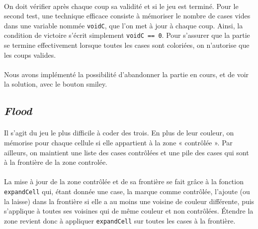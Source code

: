 \documentclass[a4paper]{article}
\newcommand\ttt\texttt
\begin{document}
	\paragraph{}
	On doit vérifier après chaque coup sa validité et si le jeu est terminé.
	Pour le second test, une technique efficace consiste à mémoriser le nombre
	de cases vides dans une variable nommée \ttt{voidC}, que l'on met à jour
	à chaque coup. Ainsi, la condition de victoire s’écrit simplement
	\ttt{voidC == 0}. Pour s’assurer que la partie se termine effectivement
	lorsque toutes les cases sont coloriées, on n’autorise que les coups
	valides.

	\paragraph{}
	Nous avons implémenté la possibilité d'abandonner la partie en cours, et de
	voir la solution, avec le bouton smiley.

	\subsection{\textsl{Flood}}

	\paragraph{}
	Il s'agit du jeu le plus difficile à coder des trois. En plus de leur
	couleur, on mémorise pour chaque cellule si elle appartient à la zone
	« contrôlée ». Par ailleurs, on maintient une liste des cases contrôlées et
	une pile des cases qui sont à la frontière de la zone controlée.

	\paragraph{}
	La mise à jour de la zone contrôlée et de sa frontière se fait grâce à la
	fonction \ttt{expandCell} qui, étant donnée une case, la marque comme
	contrôlée, l’ajoute (ou la laisse) dans la frontière si elle a au moins une
	voisine de couleur différente, puis s'applique à toutes ses voisines qui de
	même couleur et non contrôlées. Étendre la zone revient donc à appliquer
	\ttt{expandCell} sur toutes les cases à la frontière.
\end{document}
